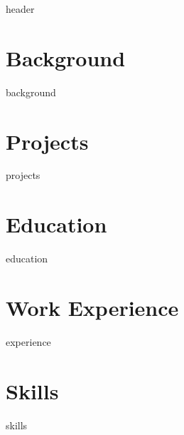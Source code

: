 \documentclass[letter,10pt]{article}
\author{Your Name}
\begin{document}
{header}
\vspace*{10pt}

\section*{\textcolor{highlightColor}{Background}}
{background}
\vspace*{10pt}

\section*{\textcolor{highlightColor}{Projects}}
{projects}
\vspace*{10pt}

\section*{\textcolor{highlightColor}{Education}}
{education}
\vspace*{10pt}

\section*{\textcolor{highlightColor}{Work Experience}}
{experience}
\vspace*{10pt}

\section*{\textcolor{highlightColor}{Skills}}
{skills}
\vspace*{10pt}
\end{document}
